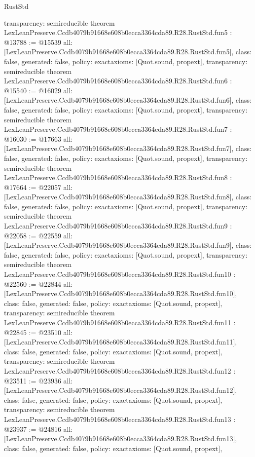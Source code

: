 \begin{lexlean}{RustStd}
\begin{coremodule}
{  transparency: semireducible
}
theorem LexLeanPreserve.Ccdb4079b91668e608b0ecca3364cda89.R28.RustStd.fun5 : @13788 := @15539 {
  all: [LexLeanPreserve.Ccdb4079b91668e608b0ecca3364cda89.R28.RustStd.fun5],
  class: false,
  generated: false,
  policy: exact{axioms: [Quot.sound, propext]},
  transparency: semireducible
}
theorem LexLeanPreserve.Ccdb4079b91668e608b0ecca3364cda89.R28.RustStd.fun6 : @15540 := @16029 {
  all: [LexLeanPreserve.Ccdb4079b91668e608b0ecca3364cda89.R28.RustStd.fun6],
  class: false,
  generated: false,
  policy: exact{axioms: [Quot.sound, propext]},
  transparency: semireducible
}
theorem LexLeanPreserve.Ccdb4079b91668e608b0ecca3364cda89.R28.RustStd.fun7 : @16030 := @17663 {
  all: [LexLeanPreserve.Ccdb4079b91668e608b0ecca3364cda89.R28.RustStd.fun7],
  class: false,
  generated: false,
  policy: exact{axioms: [Quot.sound, propext]},
  transparency: semireducible
}
theorem LexLeanPreserve.Ccdb4079b91668e608b0ecca3364cda89.R28.RustStd.fun8 : @17664 := @22057 {
  all: [LexLeanPreserve.Ccdb4079b91668e608b0ecca3364cda89.R28.RustStd.fun8],
  class: false,
  generated: false,
  policy: exact{axioms: [Quot.sound, propext]},
  transparency: semireducible
}
theorem LexLeanPreserve.Ccdb4079b91668e608b0ecca3364cda89.R28.RustStd.fun9 : @22058 := @22559 {
  all: [LexLeanPreserve.Ccdb4079b91668e608b0ecca3364cda89.R28.RustStd.fun9],
  class: false,
  generated: false,
  policy: exact{axioms: [Quot.sound, propext]},
  transparency: semireducible
}
theorem LexLeanPreserve.Ccdb4079b91668e608b0ecca3364cda89.R28.RustStd.fun10 : @22560 := @22844 {
  all: [LexLeanPreserve.Ccdb4079b91668e608b0ecca3364cda89.R28.RustStd.fun10],
  class: false,
  generated: false,
  policy: exact{axioms: [Quot.sound, propext]},
  transparency: semireducible
}
theorem LexLeanPreserve.Ccdb4079b91668e608b0ecca3364cda89.R28.RustStd.fun11 : @22845 := @23510 {
  all: [LexLeanPreserve.Ccdb4079b91668e608b0ecca3364cda89.R28.RustStd.fun11],
  class: false,
  generated: false,
  policy: exact{axioms: [Quot.sound, propext]},
  transparency: semireducible
}
theorem LexLeanPreserve.Ccdb4079b91668e608b0ecca3364cda89.R28.RustStd.fun12 : @23511 := @23936 {
  all: [LexLeanPreserve.Ccdb4079b91668e608b0ecca3364cda89.R28.RustStd.fun12],
  class: false,
  generated: false,
  policy: exact{axioms: [Quot.sound, propext]},
  transparency: semireducible
}
theorem LexLeanPreserve.Ccdb4079b91668e608b0ecca3364cda89.R28.RustStd.fun13 : @23937 := @24816 {
  all: [LexLeanPreserve.Ccdb4079b91668e608b0ecca3364cda89.R28.RustStd.fun13],
  class: false,
  generated: false,
  policy: exact{axioms: [Quot.sound, propext]},
}
\end{coremodule}
\end{lexlean}
